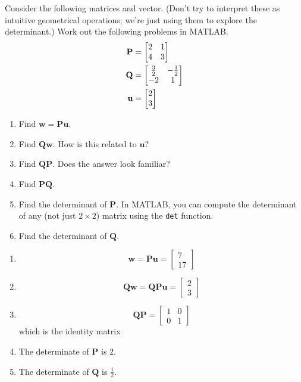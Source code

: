 \begin{prob}
Consider the following matrices and vector. (Don't try to interpret these as intuitive geometrical operations; we're just using them to explore the determinant.)  Work out the following problems in MATLAB.
\begin{align}
\mathbf{P} &= \begin{bmatrix} 2 & 1 \\ 4 & 3\end{bmatrix}\\
\mathbf{Q} &= \begin{bmatrix} \frac{3}{2} & -\frac12 \\ -2 & 1\end{bmatrix}\\
\mathbf{u} & = \begin{bmatrix} 2 \\ 3 \end{bmatrix}
\end{align}
\begin{enumerate}
\item Find $\mathbf{w} = \mathbf{Pu}$.
\item Find $\mathbf{Qw}$. How is this related to $\mathbf{u}$?
\item Find $\mathbf{QP}$. Does the answer look familiar?
\item Find $\mathbf{PQ}$.
\item Find the determinant of $\mathbf{P}$. In MATLAB, you can compute the determinant of any (not just $2\times 2$) matrix using the \texttt{det} function.
\item Find the determinant of $\mathbf{Q}$.
\end{enumerate}
\end{prob}
\begin{sol}
\begin{enumerate}
    \item $$\mathbf{w} = \mathbf{Pu} = \begin{bmatrix}
    7 \\ 17
    \end{bmatrix}$$
    \item $$\mathbf{Qw} = \mathbf{QPu} = \begin{bmatrix}
    2 \\ 3
    \end{bmatrix}$$
    \item $$\mathbf{QP} = \begin{bmatrix}
    1 & 0 \\ 0 & 1
    \end{bmatrix}$$ which is the identity matrix
    \item The determinate of $\mathbf{P}$ is 2.
    \item The determinate of $\mathbf{Q}$ is $\frac12$.
\end{enumerate}
\end{sol}


